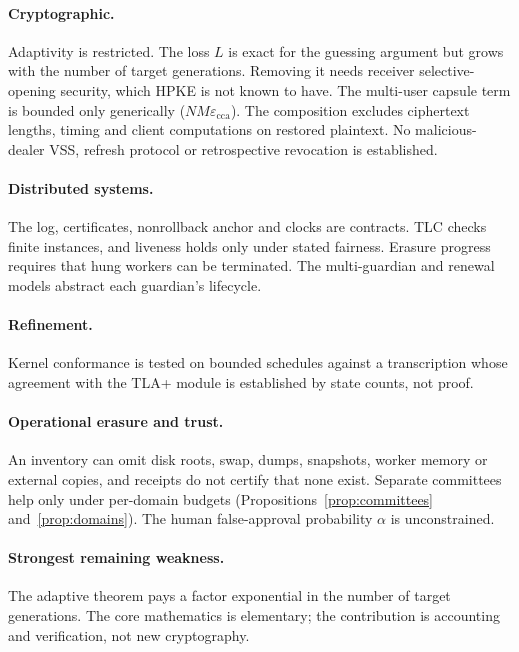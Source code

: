 \documentclass[pdflatex,sn-mathphys-num]{sn-jnl}
\theoremstyle{plain}
\theoremstyle{definition}
\begin{document}
\paragraph{Cryptographic.}
Adaptivity is restricted. The loss $L$ is exact for the guessing argument but grows with the number of target generations. Removing it needs receiver selective-opening security, which HPKE is not known to have. The multi-user capsule term is bounded only generically ($NM\varepsilon_{\mathrm{cca}}$). The composition excludes ciphertext lengths, timing and client computations on restored plaintext. No malicious-dealer VSS, refresh protocol or retrospective revocation is established.

\paragraph{Distributed systems.}
The log, certificates, nonrollback anchor and clocks are contracts. TLC checks finite instances, and liveness holds only under stated fairness. Erasure progress requires that hung workers can be terminated. The multi-guardian and renewal models abstract each guardian's lifecycle.

\paragraph{Refinement.}
Kernel conformance is tested on bounded schedules against a transcription whose agreement with the TLA+ module is established by state counts, not proof.

\paragraph{Operational erasure and trust.}
An inventory can omit disk roots, swap, dumps, snapshots, worker memory or external copies, and receipts do not certify that none exist. Separate committees help only under per-domain budgets (Propositions~\ref{prop:committees} and~\ref{prop:domains}). The human false-approval probability $\alpha$ is unconstrained.

\paragraph{Strongest remaining weakness.}
The adaptive theorem pays a factor exponential in the number of target generations. The core mathematics is elementary; the contribution is accounting and verification, not new cryptography.
\end{document}
